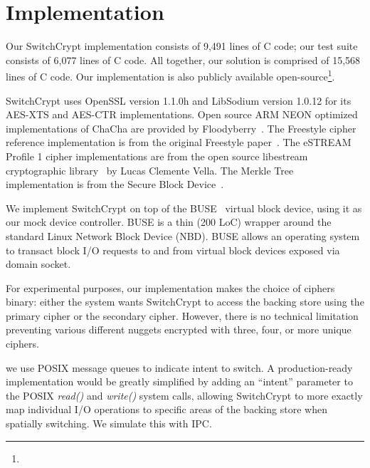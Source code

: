 \section{Implementation}\label{sec:implementation}

Our SwitchCrypt implementation consists of 9,491 lines of C code; our test suite
consists of 6,077 lines of C code. All together, our solution is comprised of
15,568 lines of C code. Our implementation is also publicly available
open-source\footnote{\SystemURI}.

SwitchCrypt uses OpenSSL version 1.1.0h and LibSodium version 1.0.12 for its
AES-XTS and AES-CTR implementations. Open source ARM NEON optimized
implementations of ChaCha are provided by Floodyberry~\cite{Floodyberry}. The
Freestyle cipher reference implementation is from the original Freestyle
paper~\cite{Freestyle}. The eSTREAM Profile 1 cipher implementations are from
the open source libestream cryptographic library~\cite{libestream} by Lucas
Clemente Vella. The Merkle Tree implementation is from the Secure Block
Device~\cite{SBD}.

We implement SwitchCrypt on top of the BUSE~\cite{BUSE} virtual block device,
using it as our mock device controller. BUSE is a thin (200 LoC) wrapper around
the standard Linux Network Block Device (NBD). BUSE allows an operating system
to transact block I/O requests to and from virtual block devices exposed via
domain socket.

For experimental purposes, our implementation makes the choice of ciphers
binary: either the system wants SwitchCrypt to access the backing store using
the primary cipher or the secondary cipher. However, there is no technical
limitation preventing various different nuggets encrypted with three, four, or
more unique ciphers. 

we use POSIX message queues to indicate intent to switch. A production-ready
implementation would be greatly simplified by adding an ``intent'' parameter to
the POSIX \textit{read()} and \textit{write()} system calls, allowing
SwitchCrypt to more exactly map individual I/O operations to specific areas of
the backing store when spatially switching. We simulate this with IPC.

